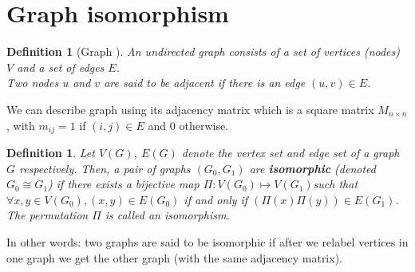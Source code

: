 \documentclass[12pt,a4paper]{article}
\newtheorem{defn}[thm]{Definition}
\begin{document}
\section{Graph isomorphism}
\begin{defn}[Graph \cite{gross2003handbook:5}] An undirected graph consists of a set of vertices (nodes) $V$ and a set of edges $E$.\\
Two nodes $u$ and $v$ are said to be adjacent if there is an edge $(u,v) \in E$.
\end{defn}
We can describe graph using its adjacency matrix which is a square matrix $M_{n\times n}$, with $m_{ij}=1 $ if $(i,j)\in E$ and $0$ otherwise.     
\begin{defn}
Let $V(G)$, $E(G)$ denote the vertex set and edge set of a graph $G$ respectively. Then, a pair of graphs $(G_0, G_1)$ are \textbf{isomorphic} (denoted $G_0 \cong G_1$) if there exists a bijective map $\Pi:V(G_0)\longmapsto V(G_1)$such that $\forall x,y \in V(G_0), (x,y)\in E(G_0)$ if and only if $(\Pi(x)\Pi(y))\in E(G_1)$. The permutation $\Pi$ is called an isomorphism.\cite{lec-notes1:3}
\end{defn}
In other words: two graphs are said to be isomorphic if after we relabel vertices in one graph we get the other graph (with the same adjacency matrix).
\end{document}
